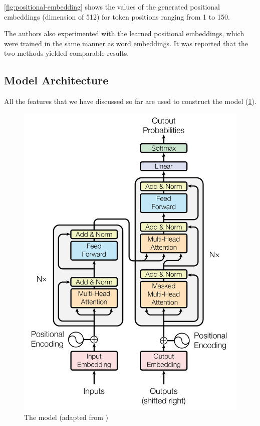 \cref{fig:positional-embedding} shows the values of the generated positional embeddings (dimension of 512) for token positions ranging from 1 to 150.

The authors also experimented with the learned positional embeddings, which were trained in the same manner as word embeddings. It was reported that the two methods yielded comparable results.

\subsection{Model Architecture}
\label{lit-trans-arch}

All the features that we have discussed so far are used to construct the \transformer model (\cref{fig:transformer}).

\begin{figure}[t]
    \centering
    \includegraphics[width=0.9\linewidth]{img/transformer.png}
    \caption{The \transformer model (adapted from \cite{DBLP:conf/nips/VaswaniSPUJGKP17})}
    \label{fig:transformer}
\end{figure}

